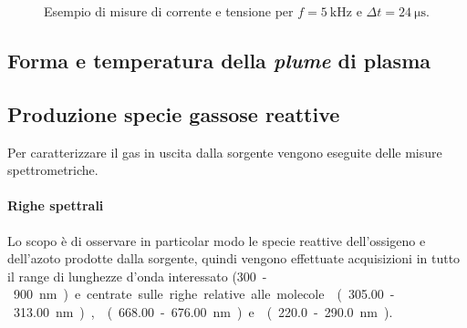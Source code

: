 \begin{figure}
\centering
{}
\caption{Esempio di misure di corrente e tensione per $f = \SI{5}{\kilo\hertz}$ e $\Delta t = \SI{24}{\micro\second}$.}
\label{fig:corrente_es}
\end{figure}

\subsection{Forma e temperatura della \emph{plume} di plasma}


\subsection{Produzione specie gassose reattive}
Per caratterizzare il gas in uscita dalla sorgente vengono eseguite delle misure spettrometriche.

\paragraph{Righe spettrali}Lo scopo è di osservare in particolar modo le specie reattive dell'ossigeno e dell'azoto prodotte dalla sorgente, quindi vengono effettuate acquisizioni in tutto il range di lunghezze d'onda interessato (\SI{300}-\SI{900}{\nano\meter}) e centrate sulle righe relative alle molecole  (\SI{305.00}-\SI{313.00}{\nano\meter}),  (\SI{668.00}-\SI{676.00}{\nano\meter}) e  (\SI{220.0}-\SI{290.0}{\nano\meter}). 

